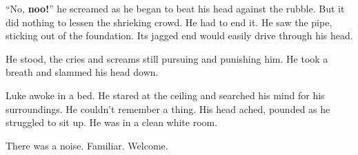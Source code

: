 ``No, {\bf noo!}'' he screamed as he began to beat his head
against the rubble. But it did nothing to lessen the shrieking
crowd. He had to end it. He saw the pipe, sticking out of the
foundation. Its jagged end would easily drive through his
head.

He stood, the cries and screams still pursuing and punishing him.
He took a breath and slammed his head down.



Luke awoke in a bed. He stared at the ceiling and searched his mind
for his surroundings. He couldn't remember a thing. His head
ached, pounded as he struggled to sit up. He was in a clean white
room.

There was a noise. Familiar. Welcome. 

 




